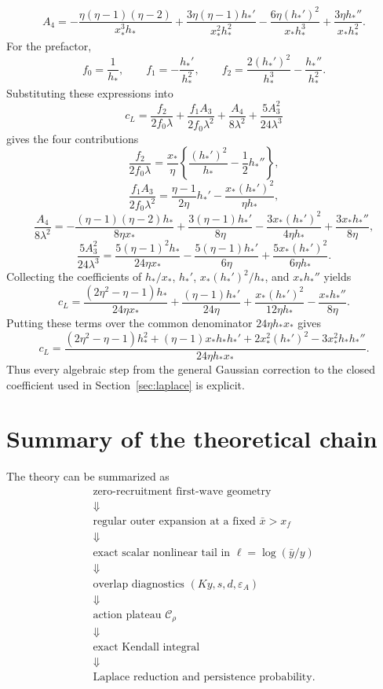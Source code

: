 \documentclass[11pt]{article}
\newcommand{\xf}{x_f}
\newcommand{\xs}{x_*}
\newcommand{\CalC}{\mathcal C_\rho}
\newcommand{\epsA}{\varepsilon_A}
\begin{document}
\[
A_4
=-\frac{\eta(\eta-1)(\eta-2)}{\xs^3h_*}
+\frac{3\eta(\eta-1)h_*'}{\xs^2h_*^2}
-\frac{6\eta(h_*')^2}{\xs h_*^3}
+\frac{3\eta h_*''}{\xs h_*^2}.
\]
For the prefactor,
\[
f_0=\frac1{h_*},
\qquad
f_1=-\frac{h_*'}{h_*^2},
\qquad
f_2=\frac{2(h_*')^2}{h_*^3}-\frac{h_*''}{h_*^2}.
\]
Substituting these expressions into
\[
 c_L
=
\frac{f_2}{2f_0\lambda}
+\frac{f_1A_3}{2f_0\lambda^2}
+\frac{A_4}{8\lambda^2}
+\frac{5A_3^2}{24\lambda^3}
\]
gives the four contributions
\[
\frac{f_2}{2f_0\lambda}
=\frac{\xs}{\eta}
\left\{
\frac{(h_*')^2}{h_*}-\frac12h_*''
\right\},
\]
\[
\frac{f_1A_3}{2f_0\lambda^2}
=\frac{\eta-1}{2\eta}h_*'
-\frac{\xs(h_*')^2}{\eta h_*},
\]
\[
\frac{A_4}{8\lambda^2}
=-\frac{(\eta-1)(\eta-2)h_*}{8\eta\xs}
+\frac{3(\eta-1)h_*'}{8\eta}
-\frac{3\xs(h_*')^2}{4\eta h_*}
+\frac{3\xs h_*''}{8\eta},
\]
\[
\frac{5A_3^2}{24\lambda^3}
=\frac{5(\eta-1)^2h_*}{24\eta\xs}
-\frac{5(\eta-1)h_*'}{6\eta}
+\frac{5\xs(h_*')^2}{6\eta h_*}.
\]
Collecting the coefficients of $h_*/\xs$, $h_*'$, $\xs(h_*')^2/h_*$, and $\xs h_*''$ yields
\[
 c_L
=\frac{(2\eta^2-\eta-1)h_*}{24\eta\xs}
+\frac{(\eta-1)h_*'}{24\eta}
+\frac{\xs(h_*')^2}{12\eta h_*}
-\frac{\xs h_*''}{8\eta}.
\]
Putting these terms over the common denominator $24\eta h_*\xs$ gives
\[
\boxed{
 c_L=
\frac{
(2\eta^2-\eta-1)h_*^2
+(\eta-1)\xs h_*h_*'
+2\xs^2(h_*')^2
-3\xs^2h_*h_*''
}{24\eta h_*\xs}.
}
\]
Thus every algebraic step from the general Gaussian correction to the closed coefficient used in Section~\ref{sec:laplace} is explicit.

\section{Summary of the theoretical chain}

The theory can be summarized as
\[
\boxed{
\begin{array}{c}
\text{zero-recruitment first-wave geometry}\\[0.2em]
\Downarrow\\[0.2em]
\text{regular outer expansion at a fixed }\bar x>\xf\\[0.2em]
\Downarrow\\[0.2em]
\text{exact scalar nonlinear tail in }\ell=\log(\bar y/y)\\[0.2em]
\Downarrow\\[0.2em]
\text{overlap diagnostics }(Ky,s,d,\epsA)\\[0.2em]
\Downarrow\\[0.2em]
\text{action plateau }\CalC\\[0.2em]
\Downarrow\\[0.2em]
\text{exact Kendall integral}\\[0.2em]
\Downarrow\\[0.2em]
\text{Laplace reduction and persistence probability.}
\end{array}
}
\]
\end{document}
